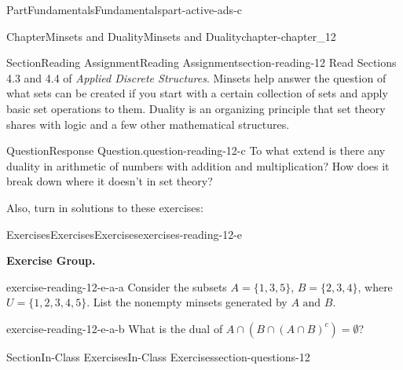 \documentclass[oneside,10pt,]{book}
\numberwithin{equation}{section}
\begin{document}
\begin{partptx}{Part}{Fundamentals}{}{Fundamentals}{}{}{part-active-ads-c}
\begin{chapterptx}{Chapter}{Minsets and Duality}{}{Minsets and Duality}{}{}{chapter-chapter_12}
\renewcommand*{\chaptername}{Chapter}
\index{}%
%
%
\typeout{************************************************}
\typeout{************************************************}
%
\begin{sectionptx}{Section}{Reading Assignment}{}{Reading Assignment}{}{}{section-reading-12}
Read Sections 4.3 and 4.4 of \emph{Applied Discrete Structures}. Minsets help answer the question of what sets can be created if you start with a certain collection of sets and apply basic set operations to them.   Duality is an organizing principle that set theory shares with logic and a few other mathematical structures.%
\begin{question}{Question}{Response Question.}{question-reading-12-c}%
To what extend is there any duality in arithmetic of numbers with addition and multiplication?  How does it break down where it doesn't in set theory?%
\end{question}
Also, turn in solutions to these exercises:%
%
%
\typeout{************************************************}
\typeout{************************************************}
%
\begin{exercises-subsection-numberless}{Exercises}{Exercises}{}{Exercises}{}{}{exercises-reading-12-e}
\par\medskip\noindent%
\textbf{Exercise Group.}\space\space%
\begin{exercisegroup}
\begin{divisionexerciseeg}{1}{}{}{exercise-reading-12-e-a-a}%
Consider the subsets \(A = \{1, 3, 5\}\), \(B = \{2,3,4\}\),  where \(U = \{1,2,3,4,5\}\).  List the nonempty minsets generated by \(A\textrm{ and }B\).%
\end{divisionexerciseeg}%
\begin{divisionexerciseeg}{2}{}{}{exercise-reading-12-e-a-b}%
What is the dual of \(A \cap (B\cap (A\cap B)^c)= \emptyset\)?%
\end{divisionexerciseeg}%
\end{exercisegroup}
\par\medskip\noindent
\end{exercises-subsection-numberless}
\end{sectionptx}
%
%
\typeout{************************************************}
\typeout{************************************************}
%
\begin{sectionptx}{Section}{In-Class Exercises}{}{In-Class Exercises}{}{}{section-questions-12}

\end{sectionptx}
\end{chapterptx}
\end{partptx}
\end{document}
